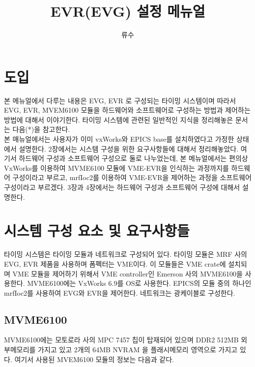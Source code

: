 \documentclass[11pt,a4paper]{article}
\begin{document}
\title{ %
EVR(EVG) 설정 메뉴얼 %
}
\author{류수}
\maketitle
\vspace{2em}


\section{도입}

본 메뉴얼에서 다루는 내용은 EVG, EVR 로 구성되는 타이밍 시스템이며 따라서
EVG, EVR, MVEM6100 모듈을 하드웨어와 소프트웨어로 구성하는 방법과 제어하는 방법에 대해서 이야기한다.
타이밍 시스템에 관련된 일반적인 지식을 정리해놓은 문서는 다음(*)을 참고한다.
\\

본 매뉴얼에서는 사용자가 이미 vxWorks와 EPICS base를 설치하였다고 가정한 상태에서 설명한다.
2장에서는 시스템 구성을 위한 요구사항들에 대해서 정리해놓았다.
여기서 하드웨어 구성과 소프트웨어 구성으로 둘로 나누었는데,
본 메뉴얼에서는 편의상 VxWorks를 이용하여 MVME6100 모듈에 VME-EVR을 인식하는 과정까지를 하드웨어 구성이라고 부르고,
mrfIoc2를 이용하여 VME-EVR을 제어하는 과정을 소프트웨어 구성이라고 부르겠다.
3장과 4장에서는 하드웨어 구성과 소프트웨어 구성에 대해서 설명한다.


\section{시스템 구성 요소 및 요구사항들}
\vspace{0.5em}
타이밍 시스템은 타이밍 모듈과 네트워크로 구성되어 있다.
타이밍 모듈은 MRF 사의 EVG, EVR 제품을 사용하며 폼펙터는 VME이다.
이 모듈들은 VME crate에 설치되며 VME 모듈을 제어하기 위해서 VME controller인 
Emerson 사의 MVME6100을 사용한다.
MVME6100에는 VxWorks 6.9를 OS로 사용한다.
EPICS의 모듈 중의 하나인 mrfIoc2를 사용하여 EVG와 EVR을 제어한다.
네트워크는 광케이블로 구성한다. 

\subsection{MVME6100}
MVME6100에는 모토로라 사의 MPC 7457 칩이 탑재되어 있으며 DDR2 512MB 외부메모리를 가지고 있고
2개의 64MB NVRAM 을 플래시메모리 영역으로 가지고 있다. 여기서 사용된  MVEM6100 모듈의 정보는 다음과 같다.
\end{document}
